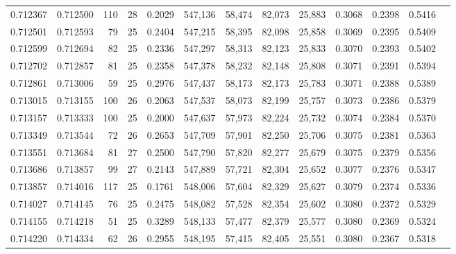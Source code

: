 \begin{tabular}{rrrrrrrrrrrrr}
0.712367 & 0.712500 &   110 &  28 &                                     0.2029 & 547,136 &  58,474 &  82,073 &  25,883 & 0.3068 & 0.2398 & 0.5416 \\
0.712501 & 0.712593 &    79 &  25 &                                     0.2404 & 547,215 &  58,395 &  82,098 &  25,858 & 0.3069 & 0.2395 & 0.5409 \\
0.712599 & 0.712694 &    82 &  25 &                                     0.2336 & 547,297 &  58,313 &  82,123 &  25,833 & 0.3070 & 0.2393 & 0.5402 \\
0.712702 & 0.712857 &    81 &  25 &                                     0.2358 & 547,378 &  58,232 &  82,148 &  25,808 & 0.3071 & 0.2391 & 0.5394 \\
0.712861 & 0.713006 &    59 &  25 &                                     0.2976 & 547,437 &  58,173 &  82,173 &  25,783 & 0.3071 & 0.2388 & 0.5389 \\
0.713015 & 0.713155 &   100 &  26 &                                     0.2063 & 547,537 &  58,073 &  82,199 &  25,757 & 0.3073 & 0.2386 & 0.5379 \\
0.713157 & 0.713333 &   100 &  25 &                                     0.2000 & 547,637 &  57,973 &  82,224 &  25,732 & 0.3074 & 0.2384 & 0.5370 \\
0.713349 & 0.713544 &    72 &  26 &                                     0.2653 & 547,709 &  57,901 &  82,250 &  25,706 & 0.3075 & 0.2381 & 0.5363 \\
0.713551 & 0.713684 &    81 &  27 &                                     0.2500 & 547,790 &  57,820 &  82,277 &  25,679 & 0.3075 & 0.2379 & 0.5356 \\
0.713686 & 0.713857 &    99 &  27 &                                     0.2143 & 547,889 &  57,721 &  82,304 &  25,652 & 0.3077 & 0.2376 & 0.5347 \\
0.713857 & 0.714016 &   117 &  25 &                                     0.1761 & 548,006 &  57,604 &  82,329 &  25,627 & 0.3079 & 0.2374 & 0.5336 \\
0.714027 & 0.714145 &    76 &  25 &                                     0.2475 & 548,082 &  57,528 &  82,354 &  25,602 & 0.3080 & 0.2372 & 0.5329 \\
0.714155 & 0.714218 &    51 &  25 &                                     0.3289 & 548,133 &  57,477 &  82,379 &  25,577 & 0.3080 & 0.2369 & 0.5324 \\
0.714220 & 0.714334 &    62 &  26 &                                     0.2955 & 548,195 &  57,415 &  82,405 &  25,551 & 0.3080 & 0.2367 & 0.5318 \\

\end{tabular}

